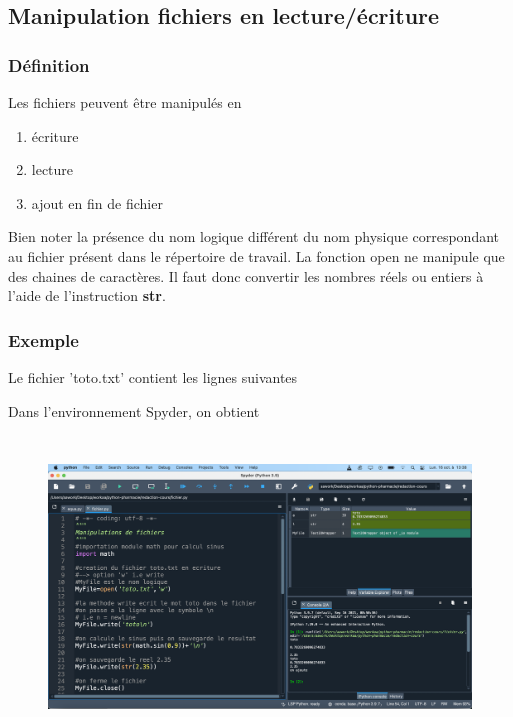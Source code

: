 \documentclass[a4paper,12pt]{article}
\begin{document}
\clearpage
\subsection{Manipulation fichiers en lecture/\'ecriture}

\subsubsection{D\'efinition}
\begin{leftbar}
Les fichiers peuvent \^etre manipul\'es en
\begin{enumerate}
\item \'ecriture
\item lecture
\item ajout en fin de fichier
\end{enumerate}
Bien noter la pr\'esence du nom logique diff\'erent du nom physique correspondant au fichier pr\'esent dans le r\'epertoire de travail.  La fonction open ne manipule que des chaines de caract\`eres. Il faut donc convertir les nombres r\'eels ou entiers \`a l'aide de l'instruction \textbf{str}.
\end{leftbar}
\subsubsection{Exemple}



Le fichier 'toto.txt' contient les lignes suivantes 


Dans l'environnement Spyder, on obtient
\begin{figure}[h]
\begin{center}
\includegraphics[height=8cm]{./png/fichier-spyder.png}
\end{center}
\end{figure}
\end{document}
